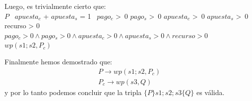 \documentclass[10pt,a4paper]{article}
\begin{document}
\vspace{\baselineskip}
Luego, es trivialmente cierto que: \\
$P$ \equiv  \ $apuesta_c$ + $apuesta_s$ = 1 \land \ $pago_c$ \textgreater \ 0 \land $pago_s$ \textgreater \ 0 \land $apuesta_c$ \textgreater \ 0 \land $apuesta_s$ \textgreater \ 0 \land recurso > 0 \rightarrow \\ $pago_c > 0 \land pago_s > 0 \land apuesta_c > 0 \land apuesta_s > 0 \land recurso > 0$ \equiv \ $wp(s1;s2,P_c)$ \ \square

\vspace{\baselineskip}
Finalmente hemos demostrado que: 
\begin{equation}
\begin{split}
    P \xrightarrow{} wp(s1;s2,P_c) \\
    P_c \xrightarrow{} wp(s3,Q) 
\end{split}
\end{equation}
y por lo tanto podemos concluir que la tripla $\{P\} s1;s2;s3 \{Q\}$ es válida.  
\end{document}
